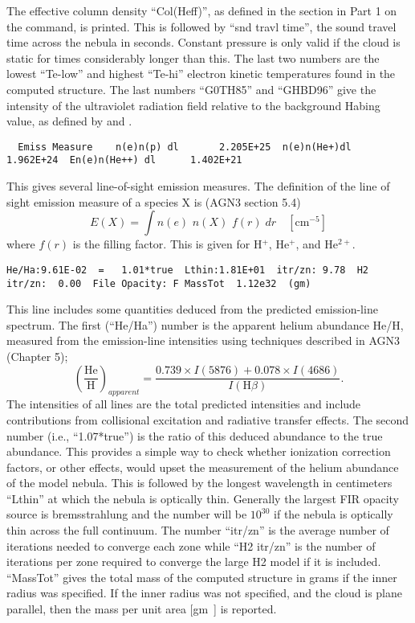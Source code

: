 The effective column density ``Col(Heff)'', as defined in the section
in Part 1 on the  command, is printed.
This is followed by ``snd travl time'',
the sound travel time across the nebula
in seconds.
Constant pressure is only valid if the cloud is static for
times considerably longer than this.
The last two numbers are the lowest
``Te-low'' and highest ``Te-hi'' electron kinetic temperatures found in
the computed structure.
The last numbers ``G0TH85'' and ``GHBD96'' give
the intensity of the ultraviolet radiation field relative to the background
Habing value, as defined by \citet{Tielens1985a} and \citet{Bertoldi1996}.
{\setverbatimfontsize{\tiny}
\begin{verbatim}
  Emiss Measure    n(e)n(p) dl       2.205E+25  n(e)n(He+)dl         1.962E+24  En(e)n(He++) dl      1.402E+21
\end{verbatim}
}

This gives several line-of-sight emission measures.
The definition of
the line of sight emission measure of a species X is
(AGN3 section 5.4)
\begin{equation}
E\left( X \right) = \int {n\left( e \right)} \,\,n\left( X
\right)\,\,f(r)\;dr\quad   [\mathrm{cm}^{-5}]%
\end{equation}
where $f(r)$ is the filling factor.  This is given for H$^+$, He$^+$, and
He$^{2+}$.
{\setverbatimfontsize{\tiny}
\begin{verbatim}
He/Ha:9.61E-02  =   1.01*true  Lthin:1.81E+01  itr/zn: 9.78  H2 itr/zn:  0.00  File Opacity: F MassTot  1.12e32  (gm)
\end{verbatim}
}

This line includes some quantities deduced from the predicted emission-line
spectrum.
The first (``He/Ha'') number is the apparent helium abundance He/H,
measured from the emission-line intensities using techniques described in
AGN3 (Chapter 5);
\begin{equation}
{\left( {\frac{{{\mathrm{He}}}}{{\mathrm{H}}}} \right)_{apparent}} = \frac{{0.739
\times I(5876) + 0.078 \times I(4686)}}{{I({\mathrm{H}}\beta )}}.%
\end{equation}
The intensities of all lines are the total predicted intensities and include
contributions from collisional excitation and radiative transfer effects.
The second number (i.e., ``1.07*true'') is the ratio
of this deduced abundance
to the true abundance.
This provides a simple way to check whether
ionization correction factors, or other effects,
would upset the measurement
of the helium abundance of the model nebula.
This is followed by the longest
wavelength in centimeters ``Lthin'' at which the nebula is optically thin.
Generally the largest FIR opacity source is bremsstrahlung and the number
will be $10^{30}$ if the nebula is optically thin across the full continuum.
The number ``itr/zn'' is the average number of iterations needed to converge
each zone while ``H2 itr/zn'' is the number of iterations per zone required
to converge the large H2 model if it is included.
``MassTot'' gives the
total mass of the computed structure in grams if the inner radius
was specified.
If the inner radius was not specified, and the cloud is plane parallel,
then the mass per unit area [gm~\pscm] is reported.

